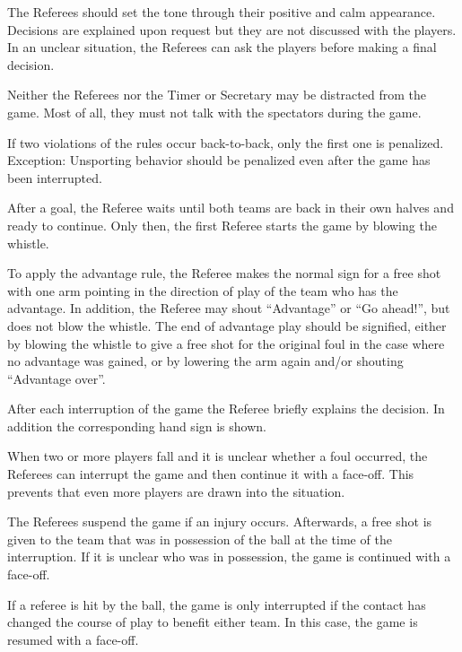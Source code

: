 The Referees should set the tone through their positive and calm appearance.
Decisions are explained upon request but they are not discussed with the players.
In an unclear situation, the Referees can ask the players before making a final decision.

Neither the Referees nor the Timer or Secretary may be distracted from the game.
Most of all, they must not talk with the spectators during the game.

If two violations of the rules occur back-to-back, only the first one is penalized.
Exception: Unsporting behavior should be penalized even after the game has been interrupted.

After a goal, the Referee waits until both teams are back in their own halves and ready to continue.
Only then, the first Referee starts the game by blowing the whistle.

To apply the advantage rule, the Referee makes the normal sign for a free shot with one arm pointing in the direction of play of the team who has the advantage.
In addition, the Referee may shout ``Advantage'' or ``Go ahead!'', but does not blow the whistle.
The end of advantage play should be signified, either by blowing the whistle to give a free shot for the original foul in the case where no advantage was gained, or by lowering the arm again and/or shouting ``Advantage over''.

After each interruption of the game the Referee briefly explains the decision.
In addition the corresponding hand sign is shown.

When two or more players fall and it is unclear whether a foul occurred, the Referees can interrupt the game and then continue it with a face-off.
This prevents that even more players are drawn into the situation.

The Referees suspend the game if an injury occurs.
Afterwards, a free shot is given to the team that was in possession of the ball at the time of the interruption.
If it is unclear who was in possession, the game is continued with a face-off.

If a referee is hit by the ball, the game is only interrupted if the contact has changed the course of play to benefit either team.
In this case, the game is resumed with a face-off.

